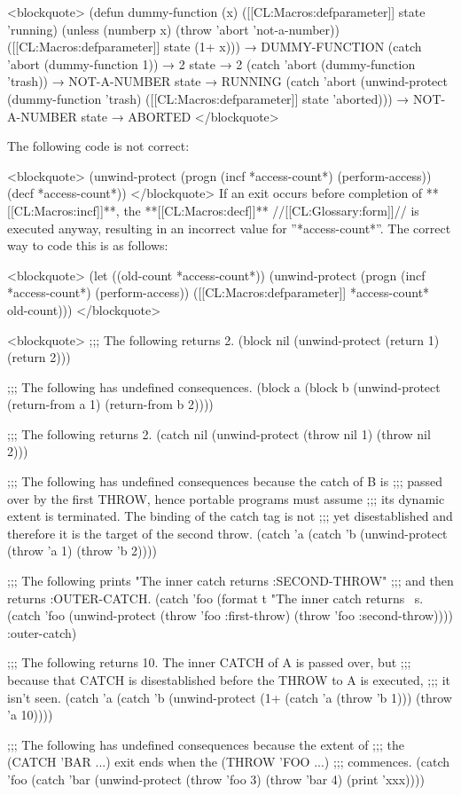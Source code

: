 <blockquote> (defun dummy-function (x) ([[CL:Macros:defparameter]] state 'running) (unless (numberp x) (throw 'abort 'not-a-number)) ([[CL:Macros:defparameter]] state (1+ x))) → DUMMY-FUNCTION (catch 'abort (dummy-function 1)) → 2 state → 2 (catch 'abort (dummy-function 'trash)) → NOT-A-NUMBER state → RUNNING (catch 'abort (unwind-protect (dummy-function 'trash) ([[CL:Macros:defparameter]] state 'aborted))) → NOT-A-NUMBER state → ABORTED </blockquote>

The following code is not correct:

<blockquote> (unwind-protect (progn (incf *access-count*) (perform-access)) (decf *access-count*)) </blockquote> If an exit occurs before completion of **[[CL:Macros:incf]]**, the **[[CL:Macros:decf]]** //[[CL:Glossary:form]]// is executed anyway, resulting in an incorrect value for ''*access-count*''. The correct way to code this is as follows:

<blockquote> (let ((old-count *access-count*)) (unwind-protect (progn (incf *access-count*) (perform-access)) ([[CL:Macros:defparameter]] *access-count* old-count))) </blockquote>


<blockquote> ;;; The following returns 2. (block nil (unwind-protect (return 1) (return 2)))

;;; The following has undefined consequences. (block a (block b (unwind-protect (return-from a 1) (return-from b 2))))

;;; The following returns 2. (catch nil (unwind-protect (throw nil 1) (throw nil 2)))

;;; The following has undefined consequences because the catch of B is ;;; passed over by the first THROW, hence portable programs must assume ;;; its dynamic extent is terminated. The binding of the catch tag is not ;;; yet disestablished and therefore it is the target of the second throw. (catch 'a (catch 'b (unwind-protect (throw 'a 1) (throw 'b 2))))

;;; The following prints "The inner catch returns :SECOND-THROW" ;;; and then returns :OUTER-CATCH. (catch 'foo (format t "The inner catch returns ~s.~ (catch 'foo (unwind-protect (throw 'foo :first-throw) (throw 'foo :second-throw)))) :outer-catch)


;;; The following returns 10. The inner CATCH of A is passed over, but ;;; because that CATCH is disestablished before the THROW to A is executed, ;;; it isn't seen. (catch 'a (catch 'b (unwind-protect (1+ (catch 'a (throw 'b 1))) (throw 'a 10))))


;;; The following has undefined consequences because the extent of ;;; the (CATCH 'BAR ...) exit ends when the (THROW 'FOO ...) ;;; commences. (catch 'foo (catch 'bar (unwind-protect (throw 'foo 3) (throw 'bar 4) (print 'xxx))))


